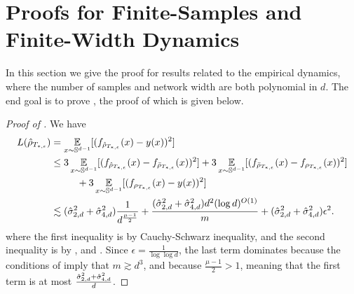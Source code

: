 
\section{Proofs for Finite-Samples and Finite-Width Dynamics}\label{section:proof_finite_sample}

In this section we give the proof for results related to the empirical dynamics, where the number of samples and network width are both polynomial in $d$. The end goal is to prove , the proof of which is given below.
\begin{proof}[Proof of ]
We have
\begin{align}
    L({\hat{\rho}}_{T_{*, \epsilon}}) &= \operatorname*{\mathbb{E}}_{x\sim\mathbb{S}^{d-1}}[(f_{{\hat{\rho}}_{T_{*, \epsilon}}}(x) - y(x))^2]\\
    &\le 3  \operatorname*{\mathbb{E}}_{x\sim\mathbb{S}^{d-1}}[(f_{{\hat{\rho}}_{T_{*, \epsilon}}}(x) - f_{{\bar{\rho}}_{T_{*, \epsilon}}}(x))^2] + 3 \operatorname*{\mathbb{E}}_{x\sim\mathbb{S}^{d-1}}[(f_{{\bar{\rho}}_{T_{*, \epsilon}}}(x) - f_{\rho_{T_{*, \epsilon}}}(x))^2] \\
    &\,\,\,\,\,\,\,\,\,\,\,\,\,\,\,\,+3  \operatorname*{\mathbb{E}}_{x\sim\mathbb{S}^{d-1}}[(f_{\rho_{T_{*, \epsilon}}}(x) - y(x))^2] \\
    &\lesssim (\hat{\sigma}_{2, d}^2 + \hat{\sigma}_{4, d}^2) \frac{1}{d^{\frac{\mu - 1}{2}}} + \frac{(\hat{\sigma}_{2, d}^2 + \hat{\sigma}_{4, d}^2) d^2 (\log d)^{O(1)}}{m}  + (\hat{\sigma}_{2, d}^2 +  \hat{\sigma}_{4, d}^2) \epsilon^2.
\end{align}
where the first inequality is by Cauchy-Schwarz inequality, and the second inequality is by ,  and . Since $\epsilon = \frac{1}{\log \log d}$, the last term dominates because the conditions of  imply that $m \gtrsim d^3$, and because $\frac{\mu - 1}{2} > 1$, meaning that the first term is at most $\frac{\hat{\sigma}_{2, d}^2 + \hat{\sigma}_{4, d}^2}{d}$.
\end{proof}

